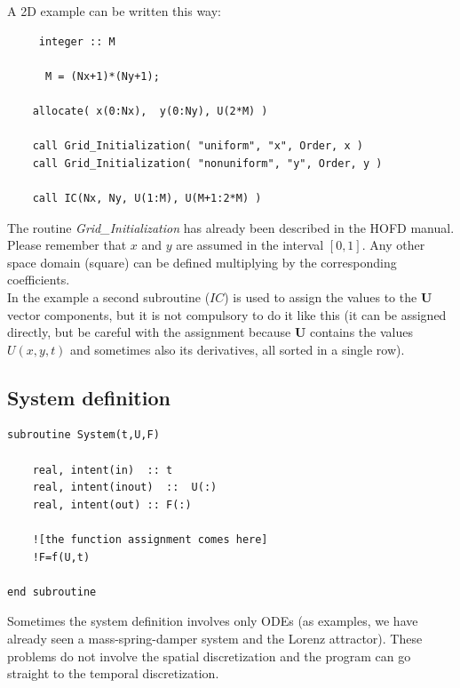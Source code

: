 \newpage 

A 2D example can be written this way: \\

\begin{blueframed}
\begin{lstlisting}
     integer :: M 
     
      M = (Nx+1)*(Ny+1); 

    allocate( x(0:Nx),  y(0:Ny), U(2*M) ) 

	call Grid_Initialization( "uniform", "x", Order, x )
	call Grid_Initialization( "nonuniform", "y", Order, y )
        
    call IC(Nx, Ny, U(1:M), U(M+1:2*M) ) 
\end{lstlisting}
\end{blueframed}

The routine {\textit{Grid\_Initialization}} has already been
described in the HOFD manual. Please remember that $x$ and $y$ are assumed in
the interval $[0,1]$. Any other space domain (square) can be defined multiplying
by the corresponding coefficients.\\

In the example a second subroutine ($\textit{IC}$) is used to assign the values
to the $\mathbf{U}$ vector components, but it is not compulsory to do it like
this (it can be assigned directly, but be careful with the assignment because
$\mathbf{U}$ contains the values $U(x,y,t)$ and sometimes also its derivatives, all sorted in a single row).
\\

\subsection{System definition}


\begin{blueframed}
\begin{lstlisting}
subroutine System(t,U,F)

	real, intent(in)  :: t
	real, intent(inout)  ::  U(:)
	real, intent(out) :: F(:)
	
	![the function assignment comes here]
	!F=f(U,t)
	
end subroutine
\end{lstlisting}
\end{blueframed}

Sometimes the system definition involves only ODEs (as examples, we have
already seen a mass-spring-damper system and the Lorenz attractor). These
problems do not involve the spatial discretization and the program can go
straight to the temporal discretization.\\

